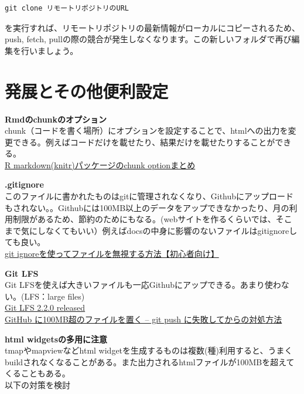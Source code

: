 \documentclass[
]{book}
\begin{document}
\begin{verbatim}
git clone リモートリポジトリのURL
\end{verbatim}

を実行すれば、リモートリポジトリの最新情報がローカルにコピーされるため、push, fetch, pullの際の競合が発生しなくなります。この新しいフォルダで再び編集を行いましょう。

\hypertarget{ux767aux5c55ux3068ux305dux306eux4ed6ux4fbfux5229ux8a2dux5b9a}{%
\chapter*{発展とその他便利設定}\label{ux767aux5c55ux3068ux305dux306eux4ed6ux4fbfux5229ux8a2dux5b9a}}

\textbf{Rmdのchunkのオプション}\\
chunk（コードを書く場所）にオプションを設定することで、htmlへの出力を変更できる。例えばコードだけを載せたり、結果だけを載せたりすることができる。\\
\href{https://teramonagi.hatenablog.com/entry/20130615/1371303616}{R markdown(knitr)パッケージのchunk optionまとめ}

\textbf{.gitignore}\\
このファイルに書かれたものはgitに管理されなくなり、Githubにアップロードもされない。。Githubには100MB以上のデータをアップできなかったり、月の利用制限があるため、節約のためにもなる。(webサイトを作るくらいでは、そこまで気にしなくてもいい）例えばdocsの中身に影響のないファイルはgitignoreしても良い。\\
\href{https://techacademy.jp/magazine/10179}{git ignoreを使ってファイルを無視する方法【初心者向け】}

\textbf{Git LFS}\\
Git LFSを使えば大きいファイルも一応Githubにアップできる。あまり使わない。(LFS：large files)\\
\href{https://github.blog/2017-06-27-git-lfs-2-2-0-released/}{Git LFS 2.2.0 released}\\
\href{https://qiita.com/kanaya/items/ad52f25da32cb5aa19e6}{GitHub に100MB超のファイルを置く -- git push に失敗してからの対処方法}

\textbf{html widgetsの多用に注意}\\
tmapやmapviewなどhtml widgetを生成するものは複数(種)利用すると、うまくbuildされなくなることがある。また出力されるhtmlファイルが100MBを超えてくることもある。\\
以下の対策を検討
\end{document}

